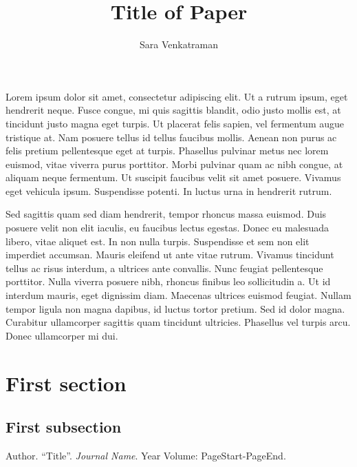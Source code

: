 \documentclass[10pt]{article}
\begin{document}
\title{Title of Paper}
\author{\small{Sara Venkatraman}}\date{}
\maketitle

Lorem ipsum dolor sit amet, consectetur adipiscing elit. Ut a rutrum ipsum, eget hendrerit neque. Fusce congue, mi quis sagittis blandit, odio justo mollis est, at tincidunt justo magna eget turpis. Ut placerat felis sapien, vel fermentum augue tristique at. Nam posuere tellus id tellus faucibus mollis. Aenean non purus ac felis pretium pellentesque eget at turpis. Phasellus pulvinar metus nec lorem euismod, vitae viverra purus porttitor. Morbi pulvinar quam ac nibh congue, at aliquam neque fermentum. Ut suscipit faucibus velit sit amet posuere. Vivamus eget vehicula ipsum. Suspendisse potenti. In luctus urna in hendrerit rutrum. \smallskip

Sed sagittis quam sed diam hendrerit, tempor rhoncus massa euismod. Duis posuere velit non elit iaculis, eu faucibus lectus egestas. Donec eu malesuada libero, vitae aliquet est. In non nulla turpis. Suspendisse et sem non elit imperdiet accumsan. Mauris eleifend ut ante vitae rutrum. Vivamus tincidunt tellus ac risus interdum, a ultrices ante convallis. Nunc feugiat pellentesque porttitor. Nulla viverra posuere nibh, rhoncus finibus leo sollicitudin a. Ut id interdum mauris, eget dignissim diam. Maecenas ultrices euismod feugiat. Nullam tempor ligula non magna dapibus, id luctus tortor pretium. Sed id dolor magna. Curabitur ullamcorper sagittis quam tincidunt ultricies. Phasellus vel turpis arcu. Donec ullamcorper mi dui.

\section{First section}

\subsection{First subsection}

{\small\begin{thebibliography}{1}    
    Author.
    ``Title''.
    \textit{Journal Name}.
    Year Volume: PageStart-PageEnd.
\end{thebibliography}}
\end{document}
